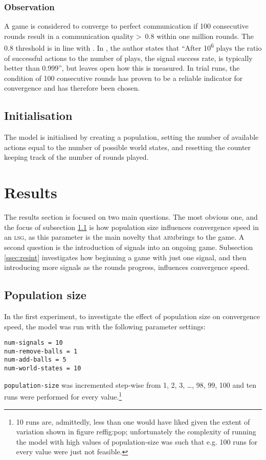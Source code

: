 \documentclass[DIV=calc,BCOR=0mm,pagesize]{scrartcl}
\newcommand{\code}[1]{\texttt{#1}}
\newcommand{\abm}{\textsc{abm}}
\newcommand{\lsg}{\textsc{lsg}}
\begin{document}
\subsubsection{Observation}
A game is considered to converge to perfect communication if 100 consecutive rounds result in a communication quality >~0.8 within one million rounds.
The 0.8 threshold is in line with \citet[p.~533]{barrett_numerical_2006, barrett_dynamic_2007}.
In \citet[sec.~2, unpaginated preprint]{barrett_numerical_2006}, the author states that ``After 10\textsuperscript{6} plays the ratio of successful actions to the number of plays, the signal success rate, is typically better than 0.999'', but leaves open how this is measured.
In trial runs, the condition of 100 consecutive rounds has proven to be a reliable indicator for convergence and has therefore been chosen.

\subsection{Initialisation}
\label{ssec:modini}
The model is initialised by creating a population, setting the number of available actions equal to the number of possible world states, and resetting the counter keeping track of the number of rounds played.

\section{Results}
\label{sec:res}
The results section is focused on two main questions.
The most obvious one, and the focus of subsection \ref{ssec:respop} is how population size influences convergence speed in an \lsg, as this parameter is the main novelty that \abm brings to the game.
A second question is the introduction of signals into an ongoing game.
Subsection \ref{ssec:resint} investigates how beginning a game with just one signal, and then introducing more signals as the rounds progress, influences convergence speed.

\subsection{Population size}
\label{ssec:respop}
In the first experiment, to investigate the effect of population size on convergence speed, the model was run with the following parameter settings:
\begin{verbatim}
num-signals = 10
num-remove-balls = 1
num-add-balls = 5
num-world-states = 10
\end{verbatim}
\code{population-size} was incremented step-wise from 1, 2, 3, \ldots, 98, 99, 100 and ten runs were performed for every value.\footnote{10 runs are, admittedly, less than one would have liked given the extent of variation shown in figure ref{fig:pop}; unfortunately the complexity of running the model with high values of population-size was such that e.g. 100 runs for every value were just not feasible.}
\end{document}

